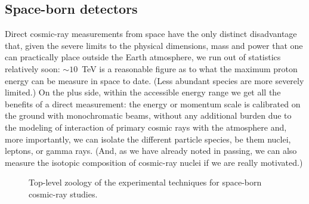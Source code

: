 \subsection{Space-born detectors}
\label{sec:cr_space_detectors}

Direct cosmic-ray measurements from space have the only distinct disadvantage that,
given the severe limits to the physical dimensions, mass and power that one can
practically place outside the Earth atmosphere, we run out of statistics relatively
soon: $\sim 10$~TeV is a reasonable figure as to what the maximum proton energy can
be measure in space to date. (Less abundant species are more severely limited.)
On the plus side, within the accessible energy range we get all the benefits of
a direct measurement: the energy or momentum scale is calibrated on the ground
with monochromatic beams, without any additional burden due to the modeling of
interaction of primary cosmic rays with the atmosphere and, more importantly,
we can isolate the different particle species, be them nuclei, leptons, or gamma
rays. (And, as we have already noted in passing, we can also measure the isotopic
composition of cosmic-ray nuclei if we are really motivated.)

\begin{figure}[htb!]
  \begin{center}
  \end{center}
  \caption{Top-level zoology of the experimental techniques for space-born
    cosmic-ray studies.}
  \label{fig:cr_space_detectors}
\end{figure}

